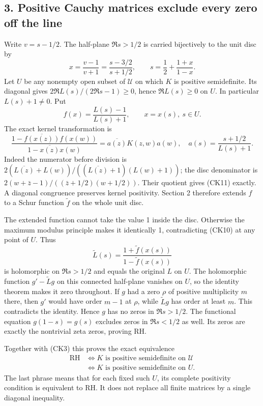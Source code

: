 \documentclass[
  10pt,
  a4paper,
]{article}
\begin{document}
\subsection{3. Positive Cauchy matrices exclude every zero off the
line}\label{positive-cauchy-matrices-exclude-every-zero-off-the-line}

Write \(v=s-1/2\). The half-plane \(\Re s>1/2\) is carried bijectively
to the unit disc by \[
x=\frac{v-1}{v+1}=\frac{s-3/2}{s+1/2},\qquad
s=\frac12+\frac{1+x}{1-x}.
\tag{CK9}
\] Let \(U\) be any nonempty open subset of \(\mathcal U\) on which
\(K\) is positive semidefinite. Its diagonal gives
\(2\Re L(s)/(2\Re s-1)\ge0\), hence \(\Re L(s)\ge0\) on \(U\). In
particular \(L(s)+1\ne0\). Put \[
f(x)=\frac{L(s)-1}{L(s)+1},\qquad x=x(s),\ s\in U.
\tag{CK10}
\] The exact kernel transformation is \[
\frac{1-\overline{f(x(z))}f(x(w))}{1-\overline{x(z)}x(w)}
=\overline{a(z)}K(z,w)a(w),\quad
a(s)=\frac{s+1/2}{L(s)+1}.
\tag{CK11}
\] Indeed the numerator before division is
\(2(\overline{L(z)}+L(w))/((\overline{L(z)}+1)(L(w)+1))\); the disc
denominator is \(2(w+\bar z-1)/((\bar z+1/2)(w+1/2))\). Their quotient
gives (CK11) exactly. A diagonal congruence preserves kernel positivity.
Section 2 therefore extends \(f\) to a Schur function \(\widetilde f\)
on the whole unit disc.

The extended function cannot take the value 1 inside the disc. Otherwise
the maximum modulus principle makes it identically 1, contradicting
(CK10) at any point of \(U\). Thus \[
\widetilde L(s)=\frac{1+\widetilde f(x(s))}{1-\widetilde f(x(s))}
\tag{CK12}
\] is holomorphic on \(\Re s>1/2\) and equals the original \(L\) on
\(U\). The holomorphic function \(g'-\widetilde Lg\) on this connected
half-plane vanishes on \(U\), so the identity theorem makes it zero
throughout. If \(g\) had a zero \(\rho\) of positive multiplicity \(m\)
there, then \(g'\) would have order \(m-1\) at \(\rho\), while
\(\widetilde Lg\) has order at least \(m\). This contradicts the
identity. Hence \(g\) has no zeros in \(\Re s>1/2\). The functional
equation \(g(1-s)=g(s)\) excludes zeros in \(\Re s<1/2\) as well. Its
zeros are exactly the nontrivial zeta zeros, proving RH.

Together with (CK3) this proves the exact equivalence \[
\boxed{\begin{aligned}
\mathrm{RH}&\Longleftrightarrow K\text{ is positive semidefinite on }\mathcal U\\
&\Longleftrightarrow K\text{ is positive semidefinite on }U.
\end{aligned}}
\tag{CK13}
\] The last phrase means that for each fixed such \(U\), its complete
positivity condition is equivalent to RH. It does not replace all finite
matrices by a single diagonal inequality.
\end{document}
